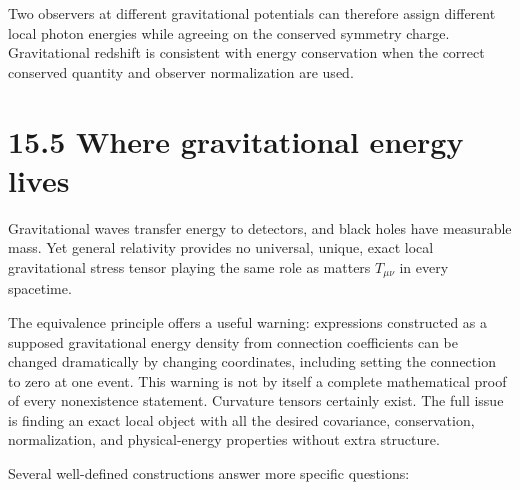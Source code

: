\documentclass[
  11pt,
  letterpaper,
  oneside,
  openany]{scrbook}
\begin{document}
Two observers at different gravitational potentials can therefore assign
different local photon energies while agreeing on the conserved symmetry
charge. Gravitational redshift is consistent with energy conservation
when the correct conserved quantity and observer normalization are used.

\hypertarget{where-gravitational-energy-lives}{%
\section{15.5 Where gravitational energy
lives}\label{where-gravitational-energy-lives}}

Gravitational waves transfer energy to detectors, and black holes have
measurable mass. Yet general relativity provides no universal, unique,
exact local gravitational stress tensor playing the same role as
matter\textquotesingle s \(T_{\mu\nu}\) in every spacetime.

The equivalence principle offers a useful warning: expressions
constructed as a supposed gravitational energy density from connection
coefficients can be changed dramatically by changing coordinates,
including setting the connection to zero at one event. This warning is
not by itself a complete mathematical proof of every nonexistence
statement. Curvature tensors certainly exist. The full issue is finding
an exact local object with all the desired covariance, conservation,
normalization, and physical-energy properties without extra structure.

Several well-defined constructions answer more specific questions:

\begingroup\small\setlength{\tabcolsep}{5pt}\renewcommand{\arraystretch}{1.13}
\end{document}
